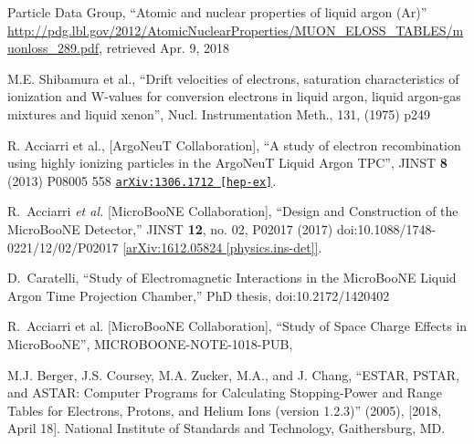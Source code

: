 \documentclass[a4paper]{article}
\begin{document}
\begin{thebibliography}{99}
 Particle Data Group, ``Atomic and nuclear properties of liquid argon (Ar)'' \url{http://pdg.lbl.gov/2012/AtomicNuclearProperties/MUON_ELOSS_TABLES/muonloss_289.pdf}, retrieved Apr. 9, 2018

 M.E. Shibamura et al., ``Drift velocities of electrons, saturation characteristics of ionization and W-values for conversion electrons in liquid argon, liquid argon-gas mixtures and liquid xenon'', Nucl. Instrumentation Meth., 131, (1975) p249

 R. Acciarri et al., [ArgoNeuT Collaboration], ``A study of electron recombination using highly ionizing particles in the ArgoNeuT Liquid Argon TPC'', JINST {\bf 8} (2013) P08005
558 \href{https://arxiv.org/abs/1306.1712}{\texttt{arXiv:1306.1712 [hep-ex]}}.

  R.~Acciarri {\it et al.} [MicroBooNE Collaboration],
  ``Design and Construction of the MicroBooNE Detector,''
  JINST {\bf 12}, no. 02, P02017 (2017)
  doi:10.1088/1748-0221/12/02/P02017
  \href{https://arxiv.org/abs/1612.05824}{[arXiv:1612.05824 [physics.ins-det]]}.

  D.~Caratelli,
  ``Study of Electromagnetic Interactions in the MicroBooNE Liquid Argon Time Projection Chamber,'' PhD thesis,
  doi:10.2172/1420402
  
 R.~Acciarri et al. [MicroBooNE Collaboration], ``Study of Space Charge Effects in MicroBooNE'', MICROBOONE-NOTE-1018-PUB, \href{https://www-microboone.fnal.gov/publications/publicnotes/MICROBOONE-NOTE-1018-PUB.pdf}{}

 M.J. Berger, J.S. Coursey, M.A. Zucker, M.A., and J. Chang, ``ESTAR, PSTAR, and ASTAR: Computer Programs for Calculating Stopping-Power and Range Tables for Electrons, Protons, and Helium Ions (version 1.2.3)'' (2005), \href{http://physics.nist.gov/Star}{} [2018, April 18]. National Institute of Standards and Technology, Gaithersburg, MD.


\end{thebibliography}



% 
% 
\end{document}
